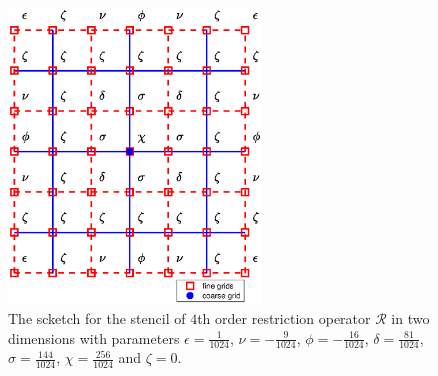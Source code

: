 \begin{figure}[htbp]
	\centering
	\includegraphics[width=0.6\textwidth]{restriction.eps}
	\caption{The scketch for the stencil of $4$th order restriction operator $\mathcal{R}$ in two dimensions with parameters $\epsilon = \frac{1}{1024}$, $\nu = -\frac{9}{1024}$, $\phi = -\frac{16}{1024}$, $\delta = \frac{81}{1024}$, $\sigma = \frac{144}{1024}$, $\chi = \frac{256}{1024}$ and $\zeta = 0$.}\label{restriction}
\end{figure}

